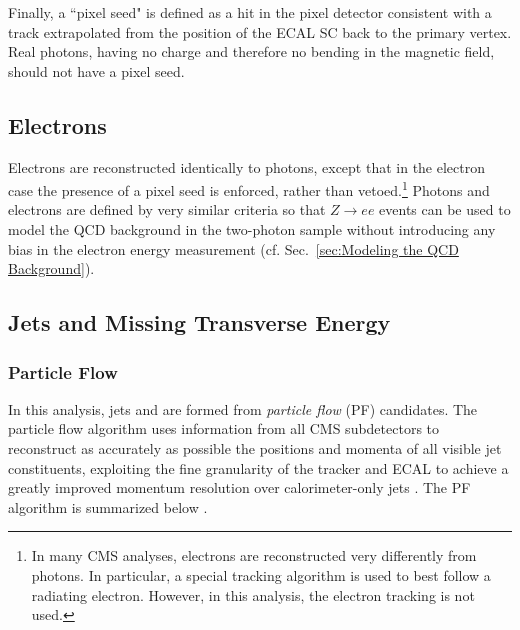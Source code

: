 \documentclass[dissertation.tex]{subfiles}
\begin{document}
Finally, a ``pixel seed" is defined as a hit in the pixel detector consistent with a track extrapolated from the position of the ECAL SC back to the primary vertex.  Real photons, having no charge and therefore no bending in the magnetic field, should not have a pixel seed.

\subsection{Electrons}
\label{sec:Electrons}

Electrons are reconstructed identically to photons, except that in the electron case the presence of a pixel seed is enforced, rather than vetoed.\footnote{In many CMS analyses, electrons are reconstructed very differently from photons.  In particular, a special tracking algorithm \cite{0954-3899-31-9-N01} is used to best follow a radiating electron.  However, in this analysis, the electron tracking is not used.}  Photons and electrons are defined by very similar criteria so that $Z\rightarrow ee$ events can be used to model the QCD background in the two-photon sample without introducing any bias in the electron energy measurement (cf. Sec.~\ref{sec:Modeling the QCD Background}).

\subsection{Jets and Missing Transverse Energy}
\label{sec:Jets and Missing Transverse Energy}

\subsubsection{Particle Flow}
\label{sec:Particle Flow}

In this analysis, jets and \MET are formed from \textit{particle flow} (PF) candidates.  The particle flow algorithm \cite{PF_algo, PF_perf} uses information from all CMS subdetectors to reconstruct as accurately as possible the positions and momenta of all visible jet constituents, exploiting the fine granularity of the tracker and ECAL to achieve a greatly improved momentum resolution over calorimeter-only jets \cite{1748-0221-6-11-P11002}.  The PF algorithm is summarized below \cite{PF_algo}.
\end{document}
